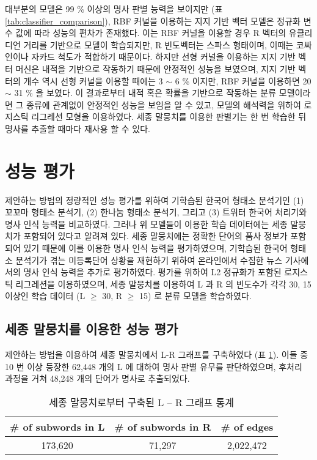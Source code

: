 \documentclass[oneside, ko,phd]{snuthesis_utf8_kor}
\begin{document}
대부분의 모델은 99 \% 이상의 명사 판별 능력을 보이지만 (표 \ref{tab:classifier_comparison}), RBF 커널을 이용하는 지지 기반 벡터 모델은 정규화 변수 값에 따라 성능의 편차가 존재했다.
이는 RBF 커널을 이용할 경우 R 벡터의 유클리디언 거리를 기반으로 모델이 학습되지만, R 빈도벡터는 스파스 형태이며, 이때는 코싸인이나 자카드 척도가 적합하기 때문이다.
하지만 선형 커널을 이용하는 지지 기반 벡터 머신은 내적을 기반으로 작동하기 때문에 안정적인 성능을 보였으며, 지지 기반 벡터의 개수 역시 선형 커널을 이용할 때에는 3 $\sim$ 6 \% 이지만, RBF 커널을 이용하면 20 $\sim$ 31 \%  을 보였다.
이 결과로부터 내적 혹은 확률을 기반으로 작동하는 분류 모델이라면 그 종류에 관계없이 안정적인 성능을 보임을 알 수 있고, 모델의 해석력을 위하여 로지스틱 리그레션 모형을 이용하였다.
세종 말뭉치를 이용한 판별기는 한 번 학습한 뒤 명사를 추출할 때마다 재사용 할 수 있다.


\section{성능 평가}

제안하는 방법의 정량적인 성능 평가를 위하여 기학습된 한국어 형태소 분석기인 (1) 꼬꼬마 형태소 분석기, (2) 한나눔 형태소 분석기, 그리고 (3) 트위터 한국어 처리기와 명사 인식 능력을 비교하였다.
그러나 위 모델들이 이용한 학습 데이터에는 세종 말뭉치가 포함되어 있다고 알려져 있다.
세종 말뭉치에는 정확한 단어의 품사 정보가 포함되어 있기 때문에 이를 이용한 명사 인식 능력을 평가하였으며, 기학습된 한국어 형태소 분석기가 겪는 미등록단어 상황을 재현하기 위하여 온라인에서 수집한 뉴스 기사에서의 명사 인식 능력을 추가로 평가하였다.
평가를 위하여 L2 정규화가 포함된 로지스틱 리그레션을 이용하였으며, 세종 말뭉치를 이용하여 L 과 R 의 빈도수가 각각 30, 15 이상인 학습 데이터 (L $\geq$ 30, R $\geq$ 15) 로 분류 모델을 학습하였다.

\subsection{세종 말뭉치를 이용한 성능 평가}

제안하는 방법을 이용하여 세종 말뭉치에서 L-R 그래프를 구축하였다 (표 \ref{tab:sejong_statistics}).
이들 중 10 번 이상 등장한 62,448 개의 L 에 대하여 명사 판별 유무를 판단하였으며, 후처리 과정을 거쳐 48,248 개의 단어가 명사로 추출되었다.

\begin{table}[ht]
\centering
\caption{세종 말뭉치로부터 구축된 L – R 그래프 통계}
\label{tab:sejong_statistics}
\begin{tabular}{|c|c|c|}
\hline
\# of subwords in L & \# of subwords in R & \# of edges \\ \hline
173,620 & 71,297 & 2,022,472   \\ \hline
\end{tabular}%
\end{table}
\end{document}
